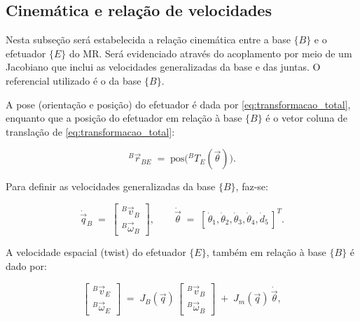 
\subsection{Cinemática e relação de velocidades}
\label{sec:cinematica_velocidades}

Nesta subseção será estabelecida a relação cinemática entre a base $\{B\}$ e o efetuador $\{E\}$ do MR. Será evidenciado através do acoplamento por meio de um Jacobiano que inclui as velocidades generalizadas da base e das juntas. O referencial utilizado é o da base $\{B\}$.

A pose (orientação e posição) do efetuador é dada por \eqref{eq:transformacao_total}, enquanto que a posição do efetuador em relação à base $\{B\}$ é o vetor coluna de translação de \eqref{eq:transformacao_total}:

\begin{equation}
\label{eq:rBE}
{}^{B}\vec r_{BE} \;=\; \text{pos}\big({}^{B}T_{E}(\vec\theta)\big).
\end{equation}

Para definir as velocidades generalizadas da base $\{B\}$, faz-se:

\begin{equation}
\label{eq:nu_base}
\dot{\vec q}_B \;=\;
\begin{bmatrix}
{}^{B}\vec v_B \\[2pt]
{}^{B}\vec \omega_B
\end{bmatrix},
\qquad
\dot{\vec\theta} \;=\; [\,\dot\theta_1,\dot\theta_2,\dot\theta_3,\dot\theta_4,\dot d_5\,]^T.
\end{equation}

A velocidade espacial (twist) do efetuador $\{E\}$, também em relação à base $\{B\}$ é dado por:

\begin{equation}
\label{eq:twist_coupled}
\begin{bmatrix}
{}^{B}\vec v_E \\[2pt]
{}^{B}\vec \omega_E
\end{bmatrix}
\;=\;
J_B(\vec q)\,
\begin{bmatrix}
{}^{B}\vec v_B \\[2pt]
{}^{B}\vec \omega_B
\end{bmatrix}
\;+\;
J_m(\vec q)\,\dot{\vec\theta},
\end{equation}

